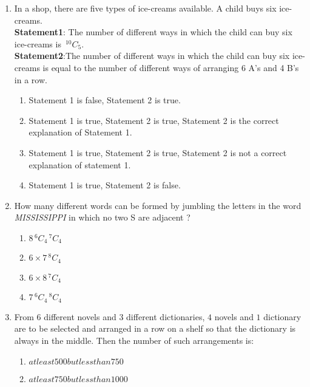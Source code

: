 \documentclass[journal,12pt,twocolumn]{IEEEtran}
\newcommand{\nCr}[2]{\,^{#1}C_{#2}}
\theoremstyle{remark}
\begin{document}
\begin{enumerate}
\begin{multicols}{2}
\begin{enumerate}
     \item $\frac{12!}{3!(4!)^3}$
     \item $\frac{12!}{3!(4!)^4}$
        \end{enumerate}
	\end{multicols}
\item In a shop, there are five types of ice-creams available. A child buys six ice-creams.\\\textbf{Statement1}: The number of different ways in which the child can buy six ice-creams is $ \nCr{10}{5} $.\\\textbf{Statement2}:The number of different ways in which the child can buy six ice-creams is equal to the number of different ways of arranging 6 A's and 4 B's in a row. \hfill{}
 \begin{enumerate}
     \item Statement 1 is false, Statement 2 is true.
     \item Statement 1 is true, Statement 2 is true, Statement 2 is the correct explanation of Statement 1.
     \item Statement 1 is true, Statement 2 is true, Statement 2 is not a correct explanation of statement 1.
     \item Statement 1 is true, Statement 2 is false.
 \end{enumerate}
\item  How many different words can be formed by jumbling the letters in the word \emph{MISSISSIPPI} in which no two S are adjacent ?
	\begin{multicols}{2}
	\begin{enumerate}
		\item $8 \nCr{6}{4} \nCr {7}{4}$
		\item $6\times7 \nCr{8}{4}$
		\item $6\times8$$\nCr{7}{4}$
		\item $ 7 \nCr{6}{4} \nCr {8}{4}$
        \end{enumerate}
	\end{multicols}
\item From $6$ different novels and $3$ different dictionaries, $4$ novels and $1$ dictionary are to be selected and arranged in a row on a shelf so that the dictionary is always in the middle. Then the number of such arrangements is: \hfill{}
 \begin{enumerate}
     \item $at least 500 but less than 750$
     \item $at least 750 but less than 1000$

\end{enumerate}
\end{enumerate}
\end{document}
